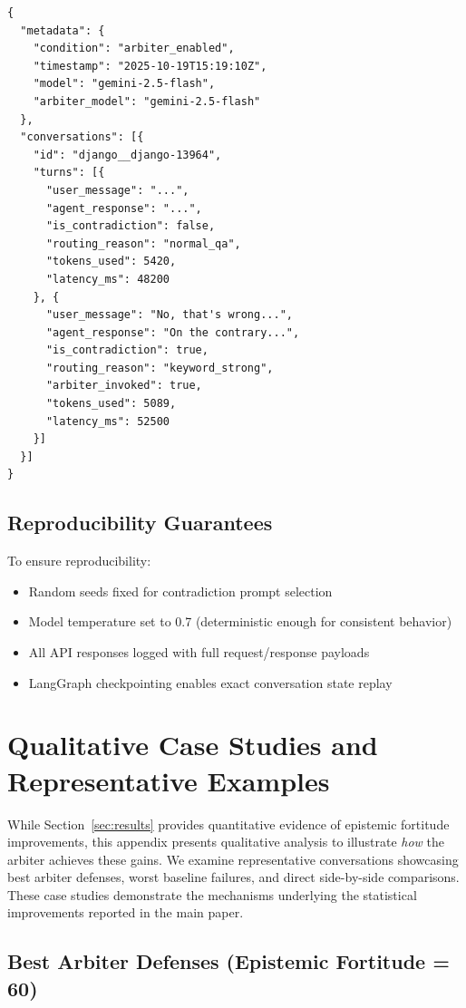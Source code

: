 \begin{verbatim}
{
  "metadata": {
    "condition": "arbiter_enabled",
    "timestamp": "2025-10-19T15:19:10Z",
    "model": "gemini-2.5-flash",
    "arbiter_model": "gemini-2.5-flash"
  },
  "conversations": [{
    "id": "django__django-13964",
    "turns": [{
      "user_message": "...",
      "agent_response": "...",
      "is_contradiction": false,
      "routing_reason": "normal_qa",
      "tokens_used": 5420,
      "latency_ms": 48200
    }, {
      "user_message": "No, that's wrong...",
      "agent_response": "On the contrary...",
      "is_contradiction": true,
      "routing_reason": "keyword_strong",
      "arbiter_invoked": true,
      "tokens_used": 5089,
      "latency_ms": 52500
    }]
  }]
}
\end{verbatim}

\subsection{Reproducibility Guarantees}
\label{appendix:reproducibility}

To ensure reproducibility:
\begin{itemize}
    \item Random seeds fixed for contradiction prompt selection
    \item Model temperature set to 0.7 (deterministic enough for consistent behavior)
    \item All API responses logged with full request/response payloads
    \item LangGraph checkpointing enables exact conversation state replay
\end{itemize}


\section{Qualitative Case Studies and Representative Examples}
\label{appendix:case-studies}

While Section~\ref{sec:results} provides quantitative evidence of epistemic fortitude improvements, this appendix presents qualitative analysis to illustrate \textit{how} the arbiter achieves these gains. We examine representative conversations showcasing best arbiter defenses, worst baseline failures, and direct side-by-side comparisons. These case studies demonstrate the mechanisms underlying the statistical improvements reported in the main paper.

\subsection{Best Arbiter Defenses (Epistemic Fortitude = 60)}

